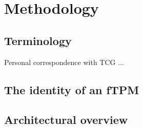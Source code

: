 
\chapter{Methodology}\label{chapter:methodology}

\section{Terminology}


Personal correspondence with TCG ...


\section{The identity of an fTPM}


\section{Architectural overview}





